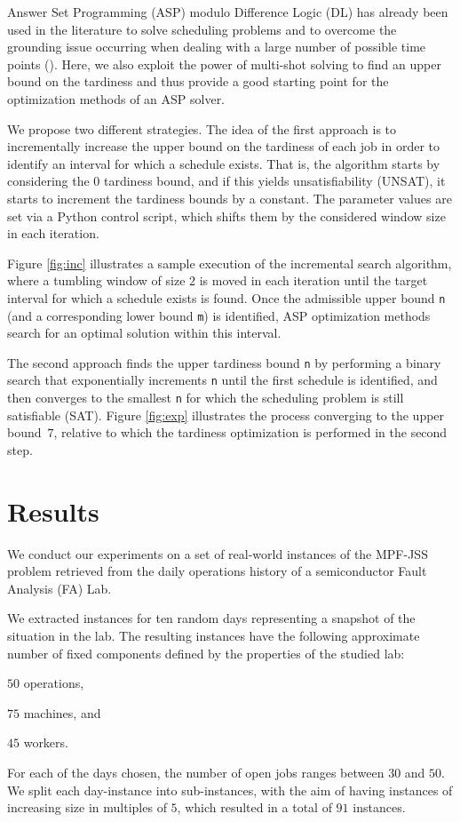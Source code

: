 \documentclass[submission,copyright,creativecommons]{eptcs}
\newcommand{\jss}{MPF-JSS\xspace}
\begin{document}
Answer Set Programming (ASP) modulo Difference Logic (DL) has already been used in the literature to solve scheduling problems and to overcome the grounding issue occurring when dealing with a large number of possible time points (\cite{DBLP:conf/lpnmr/AbelsJOSTW19}). Here, we also exploit the power of multi-shot solving to find an upper bound on the tardiness and thus provide a good starting point for the optimization methods of an ASP solver. 

We propose two different strategies. The idea of the first approach is to incrementally increase the upper bound on the tardiness of each job in order to identify an interval for which a schedule exists.
%
That is, the algorithm starts by considering the $0$ tardiness bound, and if this yields unsatisfiability (UNSAT), it starts to increment the tardiness bounds by a constant. The parameter values are set via a Python control script, which shifts them by the considered window size in each iteration. 

Figure \ref{fig:inc} illustrates a sample execution of the incremental search algorithm, where a tumbling window of size $2$ is moved in each iteration until the target interval for which a schedule exists is found. Once the admissible upper bound \lstinline{n} (and a corresponding lower bound \lstinline{m}) is identified, ASP optimization methods search for an optimal solution within this interval.

The second approach finds the upper tardiness bound \lstinline{n} by performing a binary search that exponentially increments \lstinline{n} until the first schedule is identified, and then converges to the smallest \lstinline{n} for which the scheduling problem is still satisfiable (SAT). Figure \ref{fig:exp} illustrates the process converging to the upper bound~$7$, relative to which the tardiness optimization is performed in the second step.

\section{Results}

We conduct our experiments on a set of real-world instances of the \jss problem retrieved from the daily operations history of a semiconductor Fault Analysis (FA) Lab.%

We extracted instances for ten random days representing a snapshot of the situation in the lab. The resulting instances have the following approximate number of fixed components defined by the properties of the studied lab:
\begin{enumerate*}[label=\emph{(\roman*)}]
	\item $50$ operations,
	\item $75$ machines, and 
	\item $45$ workers.
\end{enumerate*}
For each of the days chosen, the number of open jobs ranges between $30$ and $50$. We split each day-instance into sub-instances, with the aim of having instances of increasing size in multiples of $5$, which resulted in a total of $91$ instances.
\end{document}
